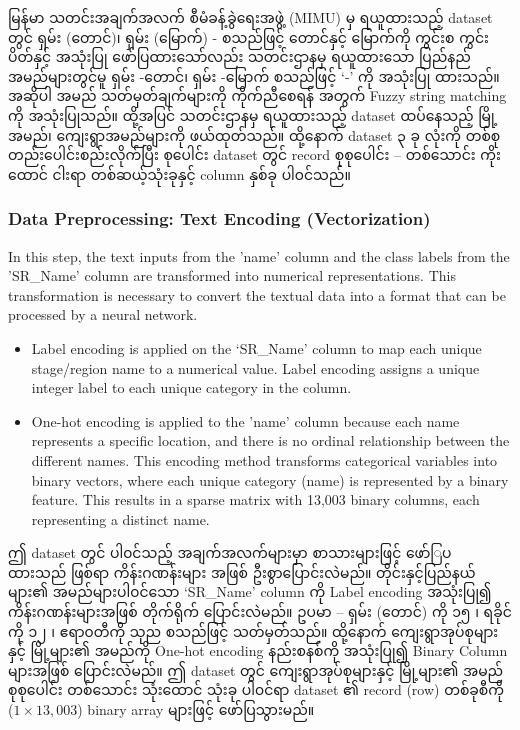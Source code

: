 မြန်မာ သတင်းအချက်အလက် စီမံခန့်ခွဲရေးအဖွဲ့ (MIMU) မှ ရယူထားသည့် dataset တွင် ရှမ်း (တောင်)၊ ရှမ်း (မြောက်) - စသည်ဖြင့် တောင်နှင့် မြောက်ကို ကွင်းစ ကွင်းပိတ်နှင့် အသုံးပြု ဖော်ပြထားသော်လည်း သတင်းဌာနမှ ရယူထားသော ပြည်နည် အမည်များတွင်မူ ရှမ်း -တောင်၊  ရှမ်း -မြောက် စသည်ဖြင့် `-' ကို အသုံးပြု ထားသည်။ အဆိုပါ အမည် သတ်မှတ်ချက်များကို ကိုက်ညီစေရန် အတွက် Fuzzy string matching ကို အသုံးပြုသည်။ ထို့အပြင် သတင်းဌာနမှ ရယူထားသည့် dataset ထပ်နေသည့် မြို့အမည်၊ ကျေးရွာအမည်များကို ဖယ်ထုတ်သည်။ ထို့နောက် dataset ၃ ခု လုံးကို တစ်စုတည်းပေါင်းစည်းလိုက်ပြီး စုပေါင်း dataset တွင် record စုစုပေါင်း -- တစ်သောင်း ကိုးထောင် ငါးရာ တစ်ဆယ့်သုံးခုနှင့် column နှစ်ခု ပါ၀င်သည်။ 

\subsubsection{Data Preprocessing: Text Encoding (Vectorization)}

In this step, the text inputs from the 'name' column and the class labels from the 'SR\_Name' column are transformed into numerical representations. This transformation is necessary to convert the textual data into a format that can be processed by a neural network. 

\begin{itemize}
  \item Label encoding is applied on the `SR\_Name' column to map each unique stage/region name to a numerical value. Label encoding assigns a unique integer label to each unique category in the column.
  \item One-hot encoding is applied to the 'name' column because each name represents a specific location, and there is no ordinal relationship between the different names. This encoding method transforms categorical variables into binary vectors, where each unique category (name) is represented by a binary feature. This results in a sparse matrix with 13,003 binary columns, each representing a distinct name.
\end{itemize}

ဤ dataset တွင် ပါ၀င်သည့် အချက်အလက်များမှာ စာသားများဖြင့် ဖော်ြပ ထားသည် ဖြစ်ရာ ကိန်းဂဏန်းများ အဖြစ် ဦးစွာပြောင်းလဲမည်။ တိုင်းနှင့်ပြည်နယ်များ၏ အမည်များပါ၀င်သော `SR\_Name' column ကို Label encoding အသုံးပြု၍ ကိန်းဂဏန်းများအဖြစ် တိုက်ရိုက် ပြောင်းလဲမည်။ ဥပမာ -- ရှမ်း (တောင်) ကို ၁၅ ၊ ရခိုင်ကို ၁၂  ၊ ဧရာ၀တီကို သုည စသည်ဖြင့် သတ်မှတ်သည်။ ထို့နောက် ကျေးရွာအုပ်စုများနှင့် မြို့များ၏ အမည်ကို One-hot encoding နည်းစနစ်ကို အသုံးပြု၍ Binary Column များအဖြစ် ပြောင်းလဲမည်။ ဤ dataset တွင် ကျေးရွာအုပ်စုများနှင့် မြို့များ၏ အမည် စုစုပေါင်း တစ်သောင်း သုံးထောင် သုံးခု ပါ၀င်ရာ dataset ၏ record (row) တစ်ခုစီကို ($1 \times 13,003$) binary array များဖြင့် ဖော်ပြသွားမည်။ 

